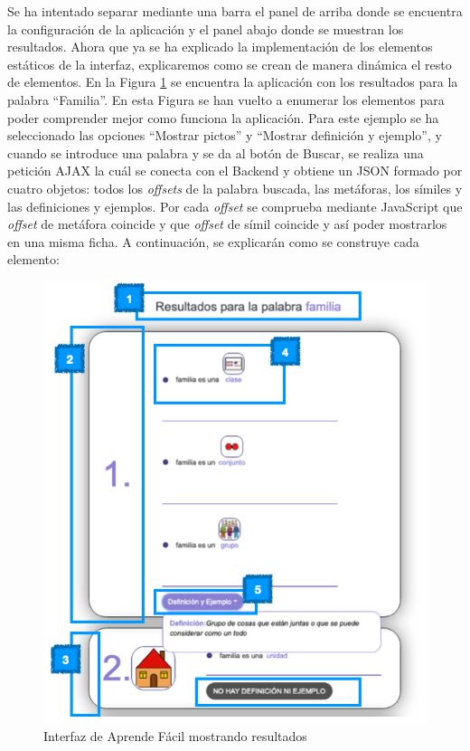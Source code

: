 Se ha intentado separar mediante una barra el panel de arriba donde se encuentra la configuración de la aplicación y el panel abajo donde se muestran los resultados. 
Ahora que ya se ha explicado la implementación de los elementos estáticos de la interfaz, explicaremos como se crean de manera dinámica el resto de elementos.
En la Figura \ref{fig:paginaResultado} se encuentra la aplicación con los resultados para la palabra ``Familia''. En esta Figura se han vuelto a enumerar los elementos para poder comprender mejor como funciona la aplicación. 
Para este ejemplo se ha seleccionado las opciones ``Mostrar pictos'' y ``Mostrar definición y ejemplo'', y cuando se introduce una palabra y se da al botón de Buscar, se realiza una petición AJAX la cuál se conecta con el Backend y obtiene un JSON formado por cuatro objetos: todos los \textit{offsets} de la palabra buscada, las metáforas, los símiles y las definiciones y ejemplos. Por cada \textit{offset} se comprueba mediante JavaScript que \textit{offset} de metáfora coincide y que \textit{offset} de símil coincide y así poder mostrarlos en una misma ficha.
A continuación, se explicarán como se construye cada elemento:


\begin{figure}[!h]
	\includegraphics[width=.9\textwidth]{Imagenes/Bitmap/Capitulo4/Frontend/paginaResultado.png}
	\caption{Interfaz de Aprende Fácil mostrando resultados }
	\label{fig:paginaResultado}
\end{figure}


